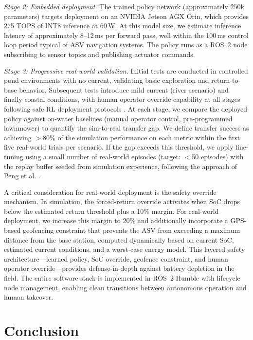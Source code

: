\documentclass[conference]{IEEEtran}
\begin{document}
\textit{Stage 2: Embedded deployment.} The trained policy network (approximately 250k parameters) targets deployment on an NVIDIA Jetson AGX Orin, which provides 275 TOPS of INT8 inference at 60\,W. At this model size, we estimate inference latency of approximately 8--12\,ms per forward pass, well within the 100\,ms control loop period typical of ASV navigation systems. The policy runs as a ROS~2 node subscribing to sensor topics and publishing actuator commands.

\textit{Stage 3: Progressive real-world validation.} Initial tests are conducted in controlled pond environments with no current, validating basic exploration and return-to-base behavior. Subsequent tests introduce mild current (river scenario) and finally coastal conditions, with human operator override capability at all stages following safe RL deployment protocols \cite{Brunke2022SafeRL}. At each stage, we compare the deployed policy against on-water baselines (manual operator control, pre-programmed lawnmower) to quantify the sim-to-real transfer gap. We define transfer success as achieving $>$80\% of the simulation performance on each metric within the first five real-world trials per scenario. If the gap exceeds this threshold, we apply fine-tuning using a small number of real-world episodes (target: $<$50 episodes) with the replay buffer seeded from simulation experience, following the approach of Peng et al. \cite{Peng2018SimToReal}.

A critical consideration for real-world deployment is the safety override mechanism. In simulation, the forced-return override activates when SoC drops below the estimated return threshold plus a 10\% margin. For real-world deployment, we increase this margin to 20\% and additionally incorporate a GPS-based geofencing constraint that prevents the ASV from exceeding a maximum distance from the base station, computed dynamically based on current SoC, estimated current conditions, and a worst-case energy model. This layered safety architecture---learned policy, SoC override, geofence constraint, and human operator override---provides defense-in-depth against battery depletion in the field. The entire software stack is implemented in ROS~2 Humble with lifecycle node management, enabling clean transitions between autonomous operation and human takeover.


\section{Conclusion}
\end{document}
